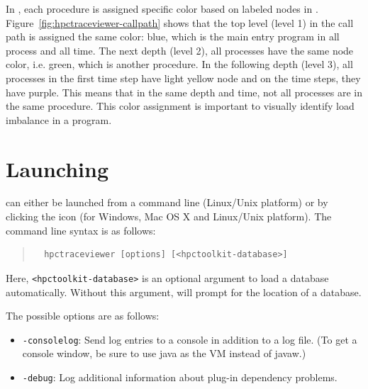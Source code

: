 In \hpctraceviewer, each procedure is assigned specific color based on labeled nodes in \hpcviewer. Figure~\ref{fig:hpctraceviewer-callpath} shows that the top level (level 1) in the call path is assigned the same color: blue, which is the main entry program in all process and all time.
The next depth (level 2), all processes have the same node color, i.e. green, which is another procedure. 
In the following depth (level 3), all processes in the first time step have light yellow node and on the time steps, they have purple. This means that in the same depth and time, not all processes are in the same procedure.
This color assignment is important to visually identify load imbalance in a program.


\section{Launching}

\hpctraceviewer{} can either be launched from a command line (Linux/Unix platform) or by clicking the \hpctraceviewer{} icon (for Windows, Mac OS X and Linux/Unix platform).
The command line syntax is as follows:
\begin{quote}
\begin{verbatim}
  hpctraceviewer [options] [<hpctoolkit-database>]
\end{verbatim}
\end{quote}
Here, \texttt{<hpctoolkit-database>} is an optional argument to load a database automatically.
Without this argument, \hpctraceviewer{} will prompt for the location of a database.

The possible options are as follows:
\begin{itemize}

 \item \texttt{-consolelog}: Send log entries to a console in addition to a log file.
   (To get a console window, be sure to use java as the VM instead of javaw.)

 \item \texttt{-debug}: Log additional information about plug-in dependency problems.
\end{itemize}



